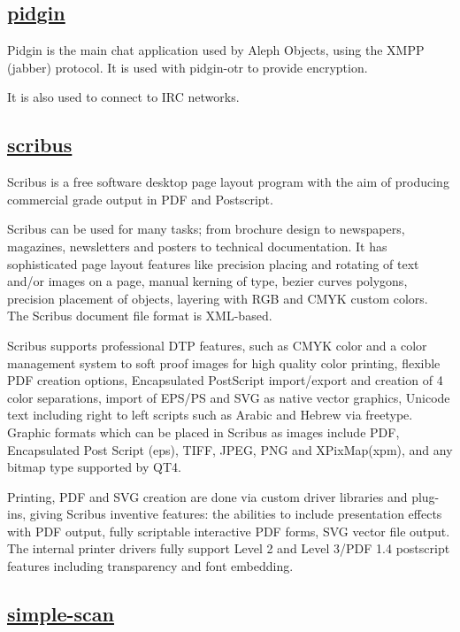 \subsection{\href{http://www.pidgin.im}{pidgin}}

Pidgin is the main chat application used by Aleph Objects, using the XMPP
(jabber) protocol. It is used with pidgin-otr to provide encryption.

It is also used to connect to IRC networks.
 
\subsection{\href{http://www.scribus.net}{scribus}}

 Scribus is a free software desktop page layout program with the aim of
 producing commercial grade output in PDF and Postscript.
 
 Scribus can be used for many tasks; from brochure design to newspapers,
 magazines, newsletters and posters to technical documentation. It has
 sophisticated page layout features like precision placing and rotating of text
 and/or images on a page, manual kerning of type, bezier curves polygons,
 precision placement of objects, layering with RGB and CMYK custom colors. The
 Scribus document file format is XML-based.
 
 Scribus supports professional DTP features, such as CMYK color and a
 color management system to soft proof images for high quality color printing,
 flexible PDF creation options, Encapsulated PostScript import/export and
 creation of 4 color separations, import of EPS/PS and SVG as native vector
 graphics, Unicode text including right to left scripts such as Arabic and
 Hebrew via freetype. Graphic formats which can be placed in Scribus as images
 include PDF, Encapsulated Post Script (eps), TIFF, JPEG, PNG and XPixMap(xpm),
 and any bitmap type supported by QT4.
 
 Printing, PDF and SVG creation are done via custom driver libraries and
 plug-ins, giving Scribus inventive features: the abilities to include
 presentation effects with PDF output, fully scriptable interactive PDF
 forms, SVG vector file output. The internal printer drivers fully support
 Level 2 and Level 3/PDF 1.4 postscript features including transparency and
 font embedding.
 
\subsection{\href{https://launchpad.net/simple-scan}{simple-scan}}

